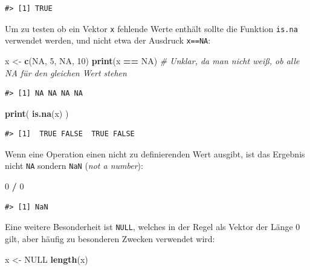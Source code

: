 \documentclass[]{book}
\newenvironment{Shaded}{\begin{snugshade}}{\end{snugshade}}
\newcommand{\KeywordTok}[1]{\textcolor[rgb]{0.13,0.29,0.53}{\textbf{#1}}}
\newcommand{\DecValTok}[1]{\textcolor[rgb]{0.00,0.00,0.81}{#1}}
\newcommand{\StringTok}[1]{\textcolor[rgb]{0.31,0.60,0.02}{#1}}
\newcommand{\CommentTok}[1]{\textcolor[rgb]{0.56,0.35,0.01}{\textit{#1}}}
\newcommand{\OtherTok}[1]{\textcolor[rgb]{0.56,0.35,0.01}{#1}}
\newcommand{\OperatorTok}[1]{\textcolor[rgb]{0.81,0.36,0.00}{\textbf{#1}}}
\newcommand{\NormalTok}[1]{#1}
\begin{document}
\begin{verbatim}
#> [1] TRUE
\end{verbatim}

Um zu testen ob ein Vektor \texttt{x} fehlende Werte enthält sollte die
Funktion \texttt{is.na} verwendet werden, und nicht etwa der Ausdruck
\texttt{x==NA}:

\begin{Shaded}
\begin{Highlighting}[]
\NormalTok{x <-}\StringTok{ }\KeywordTok{c}\NormalTok{(}\OtherTok{NA}\NormalTok{, }\DecValTok{5}\NormalTok{, }\OtherTok{NA}\NormalTok{, }\DecValTok{10}\NormalTok{)}
\KeywordTok{print}\NormalTok{(x }\OperatorTok{==}\StringTok{ }\OtherTok{NA}\NormalTok{) }\CommentTok{# Unklar, da man nicht weiß, ob alle NA für den gleichen Wert stehen}
\end{Highlighting}
\end{Shaded}

\begin{verbatim}
#> [1] NA NA NA NA
\end{verbatim}

\begin{Shaded}
\begin{Highlighting}[]
\KeywordTok{print}\NormalTok{(}
  \KeywordTok{is.na}\NormalTok{(x)}
\NormalTok{)}
\end{Highlighting}
\end{Shaded}

\begin{verbatim}
#> [1]  TRUE FALSE  TRUE FALSE
\end{verbatim}

Wenn eine Operation einen nicht zu definierenden Wert ausgibt, ist das
Ergebnis nicht \texttt{NA} sondern \texttt{NaN} (\emph{not a number}):

\begin{Shaded}
\begin{Highlighting}[]
\DecValTok{0} \OperatorTok{/}\StringTok{ }\DecValTok{0}
\end{Highlighting}
\end{Shaded}

\begin{verbatim}
#> [1] NaN
\end{verbatim}

Eine weitere Besonderheit ist \texttt{NULL}, welches in der Regel als
Vektor der Länge 0 gilt, aber häufig zu besonderen Zwecken verwendet
wird:

\begin{Shaded}
\begin{Highlighting}[]
\NormalTok{x <-}\StringTok{ }\OtherTok{NULL}
\KeywordTok{length}\NormalTok{(x)}
\end{Highlighting}
\end{Shaded}
\end{document}
